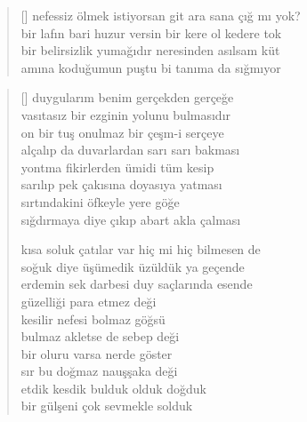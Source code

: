 \documentclass[10pt, openright, twoside]{memoir}
\theoremstyle{definition}
\begin{document}
\vspace*{\fill}
%
\newpage
{}
\vspace*{\fill}
\settowidth{\versewidth}{nefessiz ölmek istiyorsan git ara sana çığ mı yok?}
\begin{verse}[\versewidth]
  nefessiz ölmek istiyorsan git ara sana çığ mı yok? \\
  bir lafın bari huzur versin bir kere ol kedere tok \\
  bir belirsizlik yumağıdır neresinden asılsam küt \\
  amına koduğumun puştu bi tanıma da sığmıyor \\
\end{verse}
\vspace*{\fill}
%
\newpage
{}
\vspace*{\fill}
\settowidth{\versewidth}{kısa soluk çatılar var hiç mi hiç bilmesen de}
\begin{verse}[\versewidth]
  duygularım benim gerçekden gerçeğe \\
  vasıtasız bir ezginin yolunu bulmasıdır \\
  on bir tuş onulmaz bir çeşm-i serçeye \\
  alçalıp da duvarlardan sarı sarı bakması \\
  yontma fikirlerden ümidi tüm kesip \\
  sarılıp pek çakısına doyasıya yatması \\
  sırtındakini öfkeyle yere göğe \\
  sığdırmaya diye çıkıp abart akla çalması

  kısa soluk çatılar var hiç mi hiç bilmesen de \\
  soğuk diye üşümedik üzüldük ya geçende \\
  erdemin sek darbesi duy saçlarında esende \\
  güzelliği para etmez deği \\
  kesilir nefesi bolmaz göğsü \\
  bulmaz akletse de sebep deği \\
  bir oluru varsa nerde göster \\
  sır bu doğmaz nauşşaka deği \\
  etdik kesdik bulduk olduk doğduk \\
  bir gülşeni çok sevmekle solduk \\
\end{verse}
\vspace*{\fill}
\end{document}
